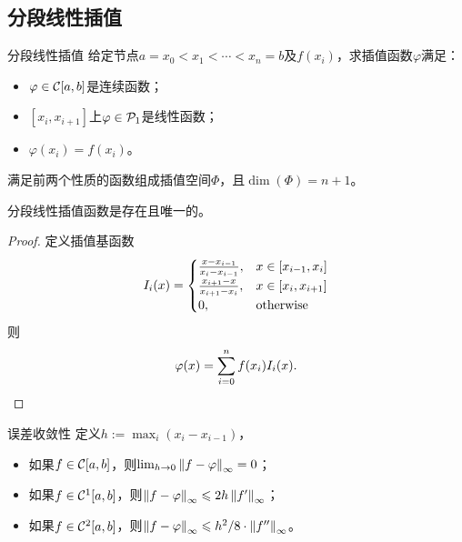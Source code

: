 \subsection{分段线性插值}

\begin{definition}
    {分段线性插值}{}
    给定节点$a=x_0<x_1<\cdots<x_n=b$及$f(x_i)$，求插值函数$\varphi$满足：
    \begin{itemize}
        \item $\varphi\in\mathcal C[a,b]$是连续函数；
        \item $[x_i,x_{i+1}]$上$\varphi\in\mathcal P_1$是线性函数；
        \item $\varphi(x_i)=f(x_i)$。
    \end{itemize}
    满足前两个性质的函数组成插值空间$\Phi$，且$\dim(\Phi)=n+1$。
\end{definition}

\begin{theorem}
    {}{}
    分段线性插值函数是存在且唯一的。
\end{theorem}

\begin{proof}
    定义插值基函数
    \begin{equation}
        I_i(x)=\begin{cases}
            \frac{x-x_{i-1}}{x_i-x_{i-1}},&x\in[x_{i-1},x_i]\\
            \frac{x_{i+1}-x}{x_{i+1}-x_i},&x\in[x_i,x_{i+1}]\\
            0,&\mathrm{otherwise}
        \end{cases}
    \end{equation}
    则
    \begin{equation}
        \varphi(x)=\sum_{i=0}^nf(x_i)I_i(x).
        \qedhere
    \end{equation}
\end{proof}

\begin{theorem}
    {误差收敛性}{}
    定义$h:=\max_i(x_i-x_{i-1})$，
    \begin{itemize}
        \item 如果$f\in\mathcal C[a,b]$，则$\lim_{h\to0}\left\lVert f-\varphi\right\rVert_\infty=0$；
        \item 如果$f\in\mathcal C^1[a,b]$，则$\left\lVert f-\varphi\right\rVert_\infty\leqslant 2h\left\lVert f'\right\rVert_\infty$；
        \item 如果$f\in\mathcal C^2[a,b]$，则$\left\lVert f-\varphi\right\rVert_\infty\leqslant h^2/8\cdot\left\lVert f''\right\rVert_\infty$。
    \end{itemize}
\end{theorem}

